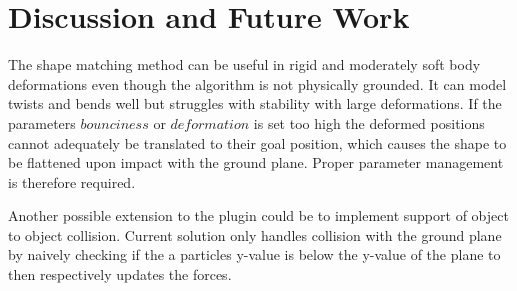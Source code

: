 \section{Discussion and Future Work}

The shape matching method can be useful in rigid and moderately soft body deformations even though the algorithm is not physically grounded. It can model twists and bends well but struggles with stability with large deformations. If the parameters $bounciness$ or $deformation$ is set too high the deformed positions cannot adequately be translated to their goal position, which causes the shape to be flattened upon impact with the ground plane. Proper parameter management is therefore required.

Another possible extension to the plugin could be to implement support of object to object collision. Current solution only handles collision with the ground plane by naively checking if the a particles y-value is below the y-value of the plane to then respectively updates the forces.


\pagebreak



